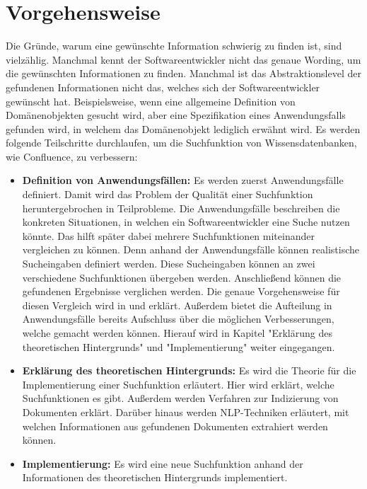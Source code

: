 \section{Vorgehensweise}
Die Gründe, warum eine gewünschte Information schwierig zu finden ist, sind vielzählig.
Manchmal kennt der Softwareentwickler nicht das genaue Wording, um die gewünschten Informationen zu finden.
Manchmal ist das Abstraktionslevel der gefundenen Informationen nicht das, welches sich der Softwareentwickler gewünscht hat.
Beispielsweise, wenn eine allgemeine Definition von Domänenobjekten gesucht wird, aber eine Spezifikation eines Anwendungsfalls gefunden wird, in welchem das Domänenobjekt lediglich erwähnt wird.
Es werden folgende Teilschritte durchlaufen, um die Suchfunktion von Wissensdatenbanken, wie Confluence, zu verbessern:
\begin{itemize}
   \item \textbf{Definition von Anwendungsfällen:}
         Es werden zuerst Anwendungsfälle definiert.
         Damit wird das Problem der Qualität einer Suchfunktion heruntergebrochen in Teilprobleme.
         Die Anwendungsfälle beschreiben die konkreten Situationen, in welchen ein Softwareentwickler eine Suche nutzen könnte.
         Das hilft später dabei mehrere Suchfunktionen miteinander vergleichen zu können.
         Denn anhand der Anwendungsfälle können realistische Sucheingaben definiert werden.
         Diese Sucheingaben können an zwei verschiedene Suchfunktionen übergeben werden.
         Anschließend können die gefundenen Ergebnisse verglichen werden.
         Die genaue Vorgehensweise für diesen Vergleich wird in  und  erklärt.
         Außerdem bietet die Aufteilung in Anwendungsfälle bereits Aufschluss über die möglichen Verbesserungen, welche gemacht werden können.
         Hierauf wird in Kapitel "Erklärung des theoretischen Hintergrunds" und "Implementierung" weiter eingegangen.
   \item \textbf{Erklärung des theoretischen Hintergrunds:}
         Es wird die Theorie für die Implementierung einer Suchfunktion erläutert.
         Hier wird erklärt, welche Suchfunktionen es gibt.
         Außerdem werden Verfahren zur Indizierung von Dokumenten erklärt.
         Darüber hinaus werden NLP-Techniken erläutert, mit welchen Informationen aus gefundenen Dokumenten extrahiert werden können.
   \item \textbf{Implementierung:}
         Es wird eine neue Suchfunktion anhand der Informationen des theoretischen Hintergrunds implementiert.

\end{itemize}
